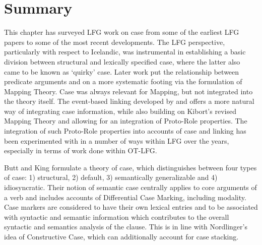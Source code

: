 \documentclass[output=paper,hidelinks]{langscibook}
\begin{document}



\section{Summary}
\label{sec:sum}

This chapter has surveyed LFG work on case from some of the earliest LFG papers 
to some of the most recent developments. The LFG perspective, particularly
with respect to Icelandic, was
instrumental in establishing a basic division between structural and lexically
specified case, where the latter also came to be known as `quirky' case.  Later
work put the relationship between predicate arguments and {\GF} on a more
systematic footing via the formulation of Mapping Theory.  Case was always
relevant for Mapping, but not integrated into the theory itself.  The
event-based linking developed by \citet{schaetzle18} and \citet{beck-butt2021} offers a more natural way of integrating case information,
while also building on Kibort's
revised Mapping Theory and allowing for an integration of Proto-Role properties.  The integration of such
Proto-Role properties into accounts of case and linking has been experimented
with in a number of ways within LFG over the years, especially in terms of work
done within OT-LFG.

Butt and King formulate a theory of case, which distinguishes between four types
of case: 1) structural, 2) default, 3) semantically generalizable and 4)
idiosyncratic.  Their notion of semantic case centrally applies to core
arguments of a verb and includes accounts of Differential Case Marking, including
modality. Case markers are considered to have their own lexical entries and to
be associated with syntactic and semantic information which  contributes to
the overall syntactic and semantics analysis of the clause.  This is in line
with  Nordlinger's idea of Constructive Case, which can additionally account for
case stacking. 
\end{document}
